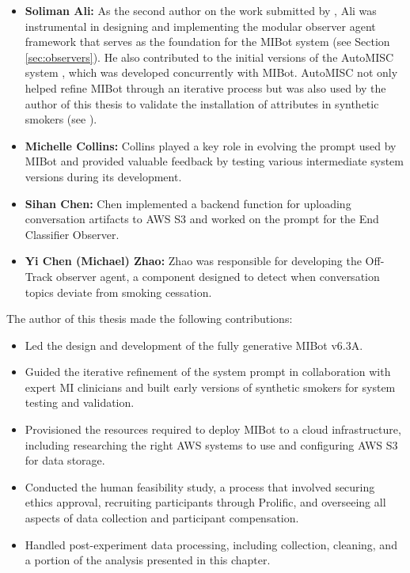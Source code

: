 \begin{itemize}
\item \textbf{Soliman Ali:} As the second author on the work submitted by \citet{mahmood-etal-2025-fully}, Ali was instrumental in designing and implementing the modular observer agent framework that serves as the foundation for the MIBot system (see Section \ref{sec:observers}). He also contributed to the initial versions of the AutoMISC system \citep{ali2025thesis,ali2025automated}, which was developed concurrently with MIBot. AutoMISC not only helped refine MIBot through an iterative process but was also used by the author of this thesis to validate the installation of attributes in synthetic smokers (see ).

\item \textbf{Michelle Collins:} Collins played a key role in evolving the prompt used by MIBot and provided valuable feedback by testing various intermediate system versions during its development.

\item \textbf{Sihan Chen:} Chen implemented a backend function for uploading conversation artifacts to AWS S3 and worked on the prompt for the End Classifier Observer.

\item \textbf{Yi Chen (Michael) Zhao:} Zhao was responsible for developing the Off-Track observer agent, a component designed to detect when conversation topics deviate from smoking cessation.
\end{itemize}

The author of this thesis made the following contributions:

\begin{itemize}
\item Led the design and development of the fully generative MIBot v6.3A.

\item Guided the iterative refinement of the system prompt in collaboration with expert MI clinicians and built early versions of synthetic smokers for system testing and validation.

\item Provisioned the resources required to deploy MIBot to a cloud infrastructure, including researching the right AWS systems to use and configuring AWS S3 for data storage.

\item Conducted the human feasibility study, a process that involved securing ethics approval, recruiting participants through Prolific, and overseeing all aspects of data collection and participant compensation.

\item Handled post-experiment data processing, including collection, cleaning, and a portion of the analysis presented in this chapter.
\end{itemize}
